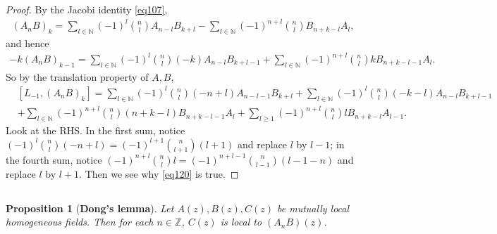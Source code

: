 \documentclass[11pt,b5paper,notitlepage]{article}
\theoremstyle{definition}
\theoremstyle{plain}
\newtheorem{pp}[df]{Proposition}
\newcommand{\Nbb}{\mathbb N}
\newcommand{\Zbb}{\mathbb Z}
\numberwithin{equation}{section}
\begin{document}
\begin{proof}
By the Jacobi identity \eqref{eq107},
\begin{align}
(A_nB)_k=\sum_{l\in\Nbb}(-1)^l{n\choose l}A_{n-l}B_{k+l}-\sum_{l\in\Nbb}(-1)^{n+l}{n\choose l}B_{n+k-l}A_l, \label{eq126}	
\end{align}
and hence
\begin{align*}
-k(A_nB)_{k-1}=\sum_{l\in\Nbb}(-1)^l{n\choose l}(-k)A_{n-l}B_{k+l-1}+\sum_{l\in\Nbb}(-1)^{n+l}{n\choose l}kB_{n+k-l-1}A_l.	
\end{align*}
So by the translation property of $A,B$,
\begin{align*}
&[L_{-1},(A_nB)_k]=\sum_{l\in\Nbb}(-1)^l{n\choose l}(-n+l)A_{n-l-1}B_{k+l}+\sum_{l\in\Nbb}(-1)^l{n\choose l}(-k-l)A_{n-l}B_{k+l-1}\\
&+\sum_{l\in\Nbb}(-1)^{n+l}{n\choose l}(n+k-l)B_{n+k-l-1}A_l+\sum_{l\geq1}(-1)^{n+l}{n\choose l}lB_{n+k-l}A_{l-1}.
\end{align*}
Look at the RHS. In the first sum, notice  $(-1)^l{n\choose l}(-n+l)=(-1)^{l+1}{n\choose l+1}(l+1)$ and replace $l$ by $l-1$; in the fourth sum, notice $(-1)^{n+l}{n\choose l}l=(-1)^{n+l-1}{n\choose l-1}(l-1-n)$ and replace $l$ by $l+1$. Then we see why \eqref{eq120} is true.
\end{proof}



\subsection{}\label{lb86}

\begin{pp}[\textbf{Dong's lemma}]
Let $A(z),B(z),C(z)$ be mutually local homogeneous fields. Then for each $n\in\Zbb$, $C(z)$ is local to $(A_nB)(z)$. 
\end{pp}
\end{document}

